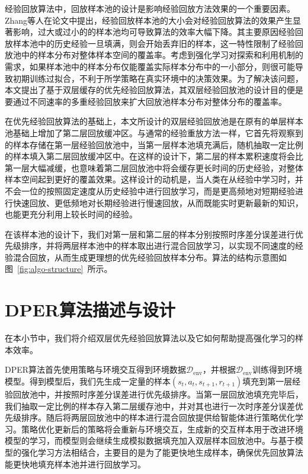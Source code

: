 经验回放算法中，回放样本池的设计是影响经验回放方法效果的一个重要因素。Zhang等人在论文\cite{zhang2017deeper}中提出，经验回放样本池的大小会对经验回放算法的效果产生显著影响，过大或过小的的样本池均可导致算法的效率大幅下降。其主要原因经验回放样本池中的历史经验一旦填满，则会开始丢弃旧的样本，这一特性限制了经验回放池中的样本分布对整体样本空间的覆盖率。考虑到强化学习对探索和利用机制的需求，如果样本池中的样本分布仅能覆盖实际样本分布中的一小部分，则很可能导致初期训练过拟合，不利于所学策略在真实环境中的决策效果。为了解决该问题，本文提出了基于双层缓存的优先经验回放算法，其双层经验回放池的设计目的便是要通过不同速率的多重经验回放来扩大回放池样本分布对整体分布的覆盖率。

在优先经验回放算法的基础上，本文所设计的双层经验回放池是在原有的单层样本池基础上增加了第二层回放缓冲区。与通常的经验重放方法一样，它首先将观察到的样本存储在第一层经验回放池中，当第一层样本池填充满后，随机抽取一定比例的样本填入第二层回放缓冲区中。在这样的设计下，第二层的样本累积速度将会比第一层大幅减缓，也意味着第二层回放池中将会缓存更长时间的历史经验，对整体样本空间起到更好的覆盖效果。这样设计的动机是，当人类在从经验中学习时，并不会一位的按照固定速度从历史经验中进行回放学习，而是更高频地对短期经验进行快速回放、更低频地对长期经验进行慢速回放，从而既能实时更新最新的知识，也能更充分利用上较长时间的经验。

在该样本池的设计下，我们对第一层和第二层的样本分别按照时序差分误差进行优先级排序，并将两层样本池中的样本取出进行混合回放学习，以实现不同速度的经验混合回放，从而生成更理想的优先经验回放样本分布。算法的结构示意图如图~\ref{fig:algo-structure}~所示。


\section{DPER算法描述与设计}

在本小节中，我们将介绍双层优先经验回放算法以及它如何帮助提高强化学习的样本效率。

DPER算法首先使用策略与环境交互得到环境数据$\mathcal{D}_{\text{env}}$，并根据$\mathcal{D}_{\text{env}}$训练得到环境模型。得到模型后，我们先生成一定量的样本$(s_t, a_t, s_{t+1}, r_{t+1})$填充到第一层经验回放池中，并按照时序差分误差进行优先级排序。当第一层回放池填充完毕后，我们抽取一定比例的样本存入第二层缓存池中，并对其也进行一次时序差分误差优先级排序。随后将两层回放池中的样本进行混合回放提供给智能体进行策略优化学习。策略优化更新后的策略将会重新与环境交互，生成新的交互样本用于改进环境模型的学习，而模型则会继续生成模拟数据填充加入双层样本回放池中。与基于模型的强化学习方法相结合，主要目的是为了能更快地生成样本，确保优先回放算法能更快地填充样本池并进行回放学习。


